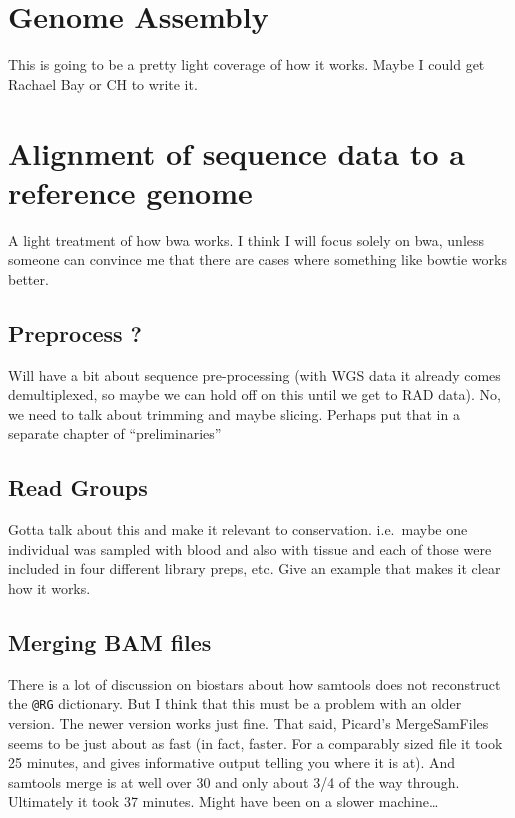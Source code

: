 \documentclass[]{krantz}
\begin{document}
\hypertarget{genome-assembly}{%
\chapter{Genome Assembly}\label{genome-assembly}}

This is going to be a pretty light coverage of how it works. Maybe I could get Rachael
Bay or CH to write it.

\hypertarget{alignment-of-sequence-data-to-a-reference-genome}{%
\chapter{Alignment of sequence data to a reference genome}\label{alignment-of-sequence-data-to-a-reference-genome}}

A light treatment of how bwa works. I think I will focus solely on bwa, unless
someone can convince me that there are cases where something like bowtie works better.

\hypertarget{preprocess}{%
\section{Preprocess ?}\label{preprocess}}

Will have a bit about sequence pre-processing (with WGS data it already
comes demultiplexed, so maybe we can hold off on this until we get to
RAD data). No, we need to talk about trimming and maybe slicing. Perhaps
put that in a separate chapter of ``preliminaries''

\hypertarget{read-groups}{%
\section{Read Groups}\label{read-groups}}

Gotta talk about this and make it relevant to conservation. i.e.~maybe one individual was sampled with blood and also with tissue and each of those were included in four different library preps, etc. Give an example that makes it
clear how it works.

\hypertarget{merging-bam-files}{%
\section{Merging BAM files}\label{merging-bam-files}}

There is a lot of discussion on biostars about how samtools does not reconstruct the
\texttt{@RG} dictionary. But I think that this must be a problem with an older version. The
newer version works just fine. That said, Picard's MergeSamFiles seems to be just about
as fast (in fact, faster. For a comparably sized file it took 25 minutes, and gives informative
output telling you where it is at). And samtools merge is at well over 30 and only about
3/4 of the way through. Ultimately it took 37 minutes. Might have been on a slower machine\ldots{}
\end{document}
